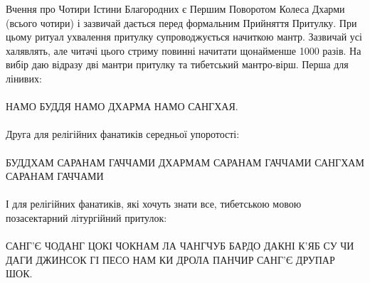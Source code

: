 Вчення про Чотири Істини Благородних є Першим Поворотом
Колеса Дхарми (всього чотири) і зазвичай дається перед формальним
Прийняття Притулку. При цьому ритуал ухвалення притулку
супроводжується начиткою мантр. Зазвичай усі халявлять, але читачі
цього стриму повинні начитати щонайменше 1000 разів. На вибір даю
відразу дві мантри притулку та тибетський мантро-вірш.
\newpage
Перша для лінивих:
\\
\\
НАМО БУДДЯ НАМО ДХАРМА НАМО САНГХАЯ.
\\
\\
Друга для релігійних фанатиків середньої упоротості:
\\
\\
БУДДХАМ САРАНАМ ГАЧЧАМИ ДХАРМАМ САРАНАМ ГАЧЧАМИ САНГХАМ САРАНАМ ГАЧЧАМИ
\\
\\
І для релігійних фанатиків, які хочуть знати все,
тибетською мовою позасектарний літургійний притулок:
\\
\\
САНГ'Є ЧОДАНГ ЦОКІ ЧОКНАМ ЛА ЧАНГЧУБ БАРДО ДАКНІ
К'ЯБ СУ ЧИ ДАГИ ДЖИНСОК ГІ ПЕСО НАМ КИ ДРОЛА ПАНЧИР
САНГ'Є ДРУПАР ШОК.